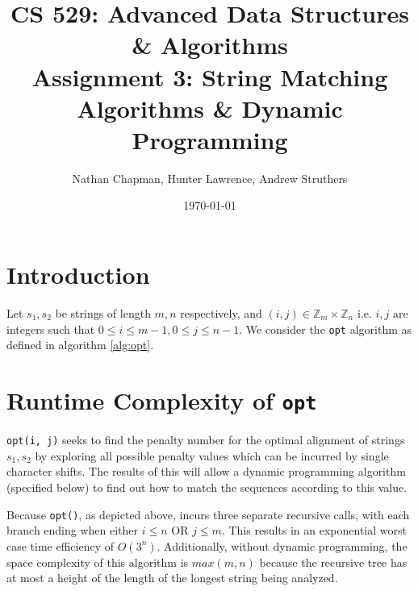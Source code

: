\documentclass{article}
\title{\vspace*{-0.625in}CS 529: Advanced Data Structures \& Algorithms \\ Assignment 3: String Matching Algorithms \& Dynamic Programming}
\author{Nathan Chapman, Hunter Lawrence, Andrew Struthers}
\date{\today}
\renewcommand{\_}{\ifincsname_\else\legacyunderscore\fi}
\newcommand{\integer}{\textbf{int} }
\begin{document}
    \maketitle

    \section*{Introduction}

        Let $s_1, s_2$ be strings of length $m, n$ respectively, and $(i, j) \in \mathbb{Z}_m \times \mathbb{Z}_n$ i.e. $i, j$ are integers such that $0 \leq i \leq m - 1, 0 \leq j \leq n - 1$.  We consider the \texttt{opt} algorithm as defined in algorithm \ref{alg:opt}.

        \begin{function}
            \DontPrintSemicolon
            \caption{opt(\integer $i$, \integer $j$)}
            \label{alg:opt}
            
        \end{function}

    \section*{Runtime Complexity of \texttt{opt}}

    \texttt{opt(i, j)} seeks to find the penalty number for the optimal alignment of strings $s_1, s_2$ by exploring all possible penalty values which can be incurred by single character shifts. The results of this will allow a dynamic programming algorithm (specified below) to find out how to match the sequences according to this value.

    Because \texttt{opt()}, as depicted above, incurs three separate recursive calls, with each branch ending when either $i \leq  n $ OR $ j \leq m$. This results in an exponential worst case time efficiency of $O(3^n)$. Additionally, without dynamic programming, the space complexity of this algorithm is $max(m, n)$ because the recursive tree has at most a height of the length of the longest string being analyzed.
    
\end{document}
